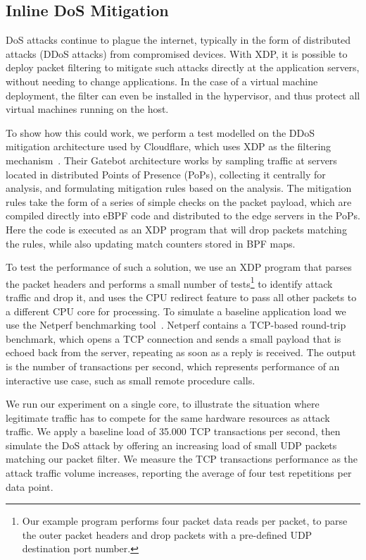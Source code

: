 \documentclass[sigconf]{acmart}
\begin{document}
\subsection{Inline DoS Mitigation}
\label{sec:dos-usecase}
DoS attacks continue to plague the internet, typically in the form of
distributed attacks (DDoS attacks) from compromised devices. With XDP, it is
possible to deploy packet filtering to mitigate such attacks directly at the
application servers, without needing to change applications. In the case of a
virtual machine deployment, the filter can even be installed in the hypervisor,
and thus protect all virtual machines running on the host.

To show how this could work, we perform a test modelled on the DDoS mitigation
architecture used by Cloudflare, which uses XDP as the filtering
mechanism~\cite{cloudflare-ddos}. Their Gatebot architecture works by sampling
traffic at servers located in distributed Points of Presence (PoPs), collecting
it centrally for analysis, and formulating mitigation rules based on the
analysis. The mitigation rules take the form of a series of simple checks on the
packet payload, which are compiled directly into eBPF code and distributed to
the edge servers in the PoPs. Here the code is executed as an XDP program that
will drop packets matching the rules, while also updating match counters stored
in BPF maps.

To test the performance of such a solution, we use an XDP program that parses
the packet headers and performs a small number of tests\footnote{Our example
  program performs four packet data reads per packet, to parse the outer packet
  headers and drop packets with a pre-defined UDP destination port number.} to
identify attack traffic and drop it, and uses the CPU redirect feature to pass
all other packets to a different CPU core for processing. To simulate a baseline
application load we use the Netperf benchmarking tool~\cite{netperf}. Netperf
contains a TCP-based round-trip benchmark, which opens a TCP connection and
sends a small payload that is echoed back from the server, repeating as soon as
a reply is received. The output is the number of transactions per second, which
represents performance of an interactive use case, such as small remote
procedure calls.

We run our experiment on a single core, to illustrate the situation where
legitimate traffic has to compete for the same hardware resources as attack
traffic. We apply a baseline load of 35.000 TCP transactions per second, then
simulate the DoS attack by offering an increasing load of small UDP packets
matching our packet filter. We measure the TCP transactions performance as the
attack traffic volume increases, reporting the average of four test repetitions
per data point.
\end{document}
